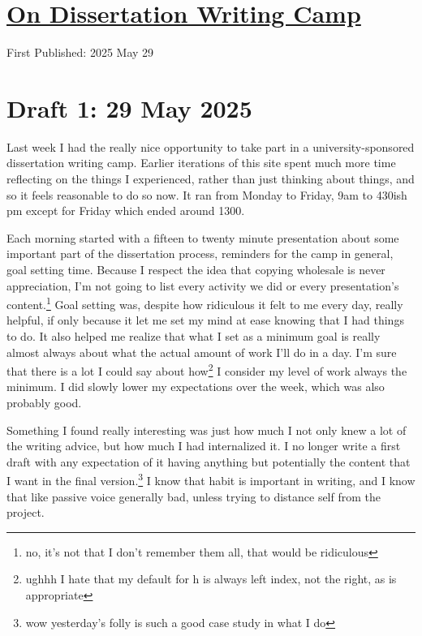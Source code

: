 \documentclass[12pt]{article}
\renewcommand{\,}{\textsuperscript{,}}
\begin{document}
  
\doublespacing  
\section{\href{dissertation-camp.html}{On Dissertation Writing Camp}}  
First Published: 2025 May 29

\section{Draft 1: 29 May 2025}

Last week I had the really nice opportunity to take part in a university-sponsored dissertation writing camp.  
Earlier iterations of this site spent much more time reflecting on the things I experienced, rather than just thinking about things, and so it feels reasonable to do so now.  
It ran from Monday to Friday, 9am to 430ish pm except for Friday which ended around 1300.

Each morning started with a fifteen to twenty minute presentation about some important part of the dissertation process, reminders for the camp in general, goal setting time.  
Because I respect the idea that copying wholesale is never appreciation, I'm not going to list every activity we did or every presentation's content.\footnote{no, it's not that I don't remember them all, that would be ridiculous}  
Goal setting was, despite how ridiculous it felt to me every day, really helpful, if only because it let me set my mind at ease knowing that I had things to do.  
It also helped me realize that what I set as a minimum goal is really almost always about what the actual amount of work I'll do in a day.  
I'm sure that there is a lot I could say about how\footnote{ughhh I hate that my default for h is always left index, not the right, as is appropriate} I consider my level of work always the minimum.  
I did slowly lower my expectations over the week, which was also probably good.

Something I found really interesting was just how much I not only knew a lot of the writing advice, but how much I had internalized it.  
I no longer write a first draft with any expectation of it having anything but potentially the content that I want in the final version.\footnote{wow yesterday's folly is such a good case study in what I do}  
I know that habit is important in writing, and I know that like passive voice generally bad, unless trying to distance self from the project.
\end{document}
